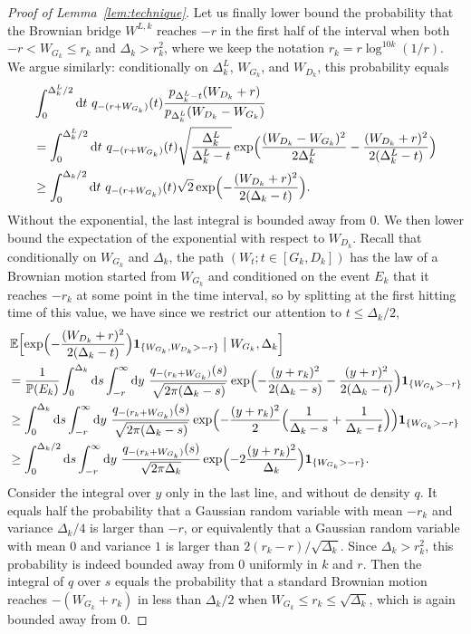 \documentclass[british, a4paper,11pt]{article}
\numberwithin{equation}{section}
\theoremstyle{definition}
\renewcommand{\P}{\mathop{}\!\mathbb{P}}
\newcommand{\E}{\mathop{}\!\mathbb{E}}
\renewcommand{\d}{\mathop{}\!\mathrm{d}}
\newcommand{\ind}[1]{\mathbf{1}_{\{#1\}}}
\begin{document}
\begin{proof}[Proof of Lemma~\ref{lem:technique}]
Let us finally lower bound the probability that the Brownian bridge $W^{L,k}$ reaches $-r$ in the first half of the interval when both $-r < W_{G_k} \leq r_{k}$ and $\Delta_k > r_{k}^2$, where we keep the notation $r_{k}=r \log^{10k}(1/r)$.
We argue similarly: conditionally on $\Delta^L_k$, $W_{G_k}$, and $W_{D_k}$, this probability equals
\begin{align*}
&\int_0^{\Delta^L_k/2} \d t\ q_{-(r+W_{G_k})}(t) \frac{p_{\Delta^L_k-t}(W_{D_k}+r)}{p_{\Delta^L_k}(W_{D_k}-W_{G_k})}\\
&= \int_0^{\Delta^L_k/2} \d t\ q_{-(r+W_{G_k})}(t) \sqrt{\frac{\Delta^L_k}{\Delta^L_k-t}} \exp\Bigl(\frac{(W_{D_k}-W_{G_k})^2}{2 \Delta^L_k} - \frac{(W_{D_k}+r)^2}{2(\Delta^L_k-t)}\Bigr)
\\
&\geq \int_0^{\Delta_k/2} \d t\ q_{-(r+W_{G_k})}(t) \sqrt{2} \exp\Bigl(- \frac{(W_{D_k}+r)^2}{2 (\Delta_k-t)}\Bigr)
.\end{align*}
Without the exponential, the last integral is bounded away from $0$.
We then lower bound the expectation of the exponential with respect to $W_{D_k}$.
Recall that conditionally on $W_{G_k}$ and $\Delta_k$, the path $(W_t; t \in [G_k, D_k])$ has the law of a Brownian motion started from $W_{G_k}$ and conditioned on the event $E_k$ that it reaches $-r_{k}$ at some point in the time interval, so by splitting at the first hitting time of this value, we have since we restrict our attention to $t \leq \Delta_k/2$,
\begin{align*}
&\E\Bigl[\exp\Bigl(- \frac{(W_{D_k}+r)^2}{2(\Delta_k-t)}\Bigr) \ind{W_{G_k}, W_{D_k}>-r} \bigm| W_{G_k}, \Delta_k\Bigr]
\\
&= \frac{1}{\P(E_k)} \int_0^{\Delta_k} \d s \int_{-r}^\infty \d y\ \frac{q_{-(r_{k}+W_{G_k})}(s)}{\sqrt{2\pi(\Delta_k-s)}} \exp\Bigl(- \frac{(y+r_{k})^2}{2(\Delta_k-s)} - \frac{(y+r)^2}{2 (\Delta_k-t)}\Bigr) \ind{W_{G_k}>-r}
\\
&\geq \int_0^{\Delta_k} \d s \int_{-r}^\infty \d y\ \frac{q_{-(r_{k}+W_{G_k})}(s)}{\sqrt{2 \pi(\Delta_k-s)}} \exp\Bigl(- \frac{(y+r_{k})^2}{2} \Bigl(\frac{1}{\Delta_k-s}+\frac{1}{\Delta_k-t}\Bigr)\Bigr) \ind{W_{G_k}>-r}
\\
&\geq \int_0^{\Delta_k/2} \d s \int_{-r}^\infty \d y\ \frac{q_{-(r_{k}+W_{G_k})}(s)}{\sqrt{2 \pi \Delta_k}} \exp\Bigl(- 2 \frac{(y+r_{k})^2}{\Delta_k}\Bigr) \ind{W_{G_k}>-r}
.\end{align*}
Consider the integral over $y$ only in the last line, and without de density $q$. It equals half the probability that a Gaussian random variable with mean $-r_{k}$ and variance $\Delta_k/4$ is larger than $-r$, or equivalently that a Gaussian random variable with mean $0$ and variance $1$ is larger than $2(r_{k}-r)/\sqrt{\Delta_k}$. Since $\Delta_k > r_{k}^2$, this probability is indeed bounded away from $0$ uniformly in $k$ and $r$.
Then the integral of $q$ over $s$ equals the probability that a standard Brownian motion reaches $-(W_{G_k}+r_{k})$ in less than $\Delta_k/2$ when $W_{G_k} \leq r_{k} \leq \sqrt{\Delta_k}$, which is again bounded away from $0$.


\end{proof}
\end{document}
